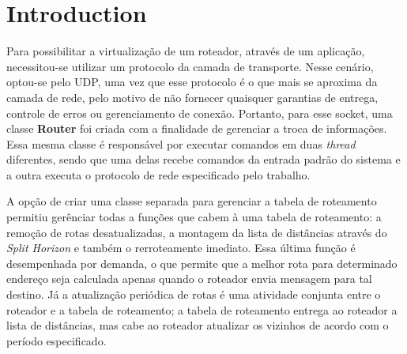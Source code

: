 \section{Introduction}

Para possibilitar a virtualização de um roteador, através de um aplicação,
necessitou-se utilizar um protocolo da camada de transporte.
Nesse cenário, optou-se pelo UDP, uma vez que esse protocolo é o que mais se
aproxima da camada de rede, pelo motivo de não fornecer quaisquer garantias
de entrega, controle de erros ou gerenciamento de conexão.
Portanto, para esse socket, uma classe \textbf{Router} foi criada com a
finalidade de gerenciar a troca de informações.
Essa mesma classe é responsável por executar comandos em duas \textit{thread}
diferentes, sendo que uma delas recebe comandos da entrada padrão do sistema e 
a outra executa o protocolo de rede especificado pelo trabalho.

A opção de criar uma classe separada para gerenciar a tabela de roteamento
permitiu gerênciar todas a funções que cabem à uma tabela de roteamento: a
remoção de rotas desatualizadas, a montagem da lista de distâncias através
do \textit{Split Horizon} e também o rerroteamente imediato. Essa última função
é desempenhada por demanda, o que permite que a melhor rota para determinado
endereço seja calculada apenas quando o roteador envia mensagem para tal
destino. Já a atualização periódica de rotas é uma atividade conjunta entre o
roteador e a tabela de roteamento; a tabela de roteamento entrega ao roteador
a lista de distâncias, mas cabe ao roteador atualizar os vizinhos de acordo com
o período especificado.